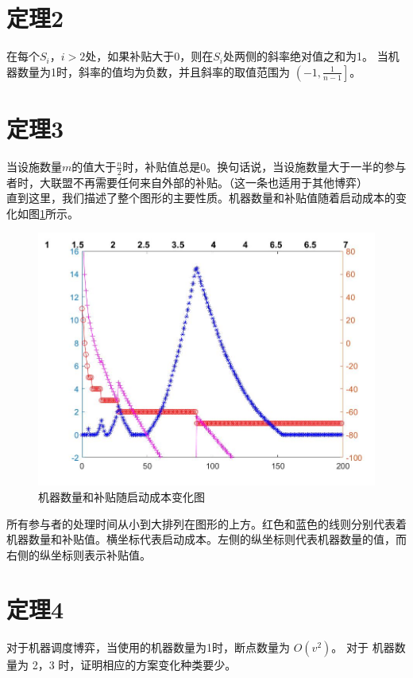 \documentclass[UTF8]{article}
\begin{document}
\section*{定理2}
在每个$S_i，i>2$处，如果补贴大于0，则在$S_i$处两侧的斜率绝对值之和为1。
当机器数量为1时，斜率的值均为负数，并且斜率的取值范围为 $\left(-1, \frac{1}{n-1} \right]$。

\section*{定理3}
当设施数量$m$的值大于$\frac{n}{2}$时，补贴值总是0。换句话说，当设施数量大于一半的参与者时，大联盟不再需要任何来自外部的补贴。（这一条也适用于其他博弈） \\
直到这里，我们描述了整个图形的主要性质。机器数量和补贴值随着启动成本的变化如图\ref{fig:Image1}所示。

\begin{figure}[h]%
	\centering  %
	\includegraphics[width=0.8\linewidth]{Figures/Image30}  %
	\caption{机器数量和补贴随启动成本变化图}  %
	\label{fig:Image1}   %
\end{figure}

所有参与者的处理时间从小到大排列在图形的上方。红色和蓝色的线则分别代表着机器数量和补贴值。横坐标代表启动成本。左侧的纵坐标则代表机器数量的值，而右侧的纵坐标则表示补贴值。


\section*{定理4}
对于机器调度博弈，当使用的机器数量为1时，断点数量为 $O(v^2)$。
对于 机器数量为 2，3 时，证明相应的方案变化种类要少。
\end{document}
